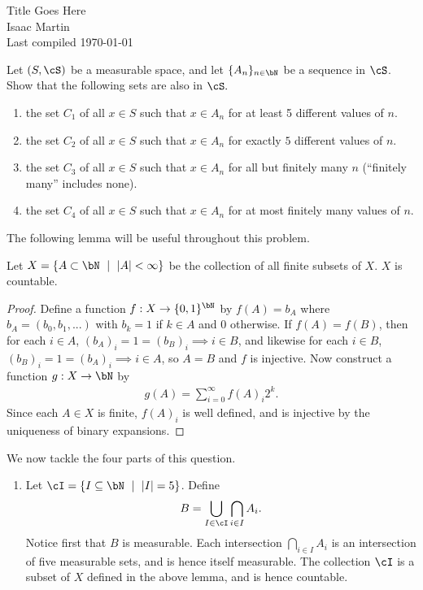 \pagestyle{empty}
	\LARGE
\begin{center}
	Title Goes Here \\
	\Large
	Isaac Martin \\
    Last compiled \today
\end{center}
\normalsize
\vspace{-2mm}
\hru
{}
\begin{homework}[e]
	\prob Let $(S,\cS)$ be a measurable space, and let $\{A_n\}_{n\in \bN}$ be a sequence in $\cS$. Show that the following sets are also in $\cS.$
	\begin{enumerate}[(1)]
		\item the set $C_1$ of all $x \in S$ such that $x \in A_n$ for at least 5 different values of $n$.
		\item the set $C_2$ of all $x \in S$ such that $x \in A_n$ for exactly $5$ different values of $n$.
		\item the set $C_3$ of all $x \in S$ such that $x \in A_n$ for all but finitely many $n$ (``finitely many'' includes none).
		\item the set $C_4$ of all $x \in S$ such that $x \in A_n$ for at most finitely many values of $n$.
	\end{enumerate}
	\begin{prf}
		The following lemma will be useful throughout this problem.
		\begin{lem}\label{lem:finite-subsets-of-bN}
			Let $X = \{A \subset \bN ~\mid~ |A| < \infty\}$ be the collection of all finite subsets of $X$. $X$ is countable.
		\end{lem}
		\begin{proof}
			Define a function $f:X \to \{0,1\}^\bN$ by $f(A) = b_A$ where $b_A = (b_0,b_1,...)$ with $b_k = 1$ if $k \in A$ and $0$ otherwise. If $f(A) = f(B)$, then for each $i \in A$, $(b_A)_i = 1 = (b_B)_i \implies i \in B$, and likewise for each $i \in B$, $(b_B)_i = 1 = (b_A)_i \implies i \in A$, so $A = B$ and $f$ is injective.
			Now construct a function $g:X\to \bN$ by 
			\begin{align*}
				g(A) = \sum_{i = 0}^\infty f(A)_i 2^k.
			\end{align*}
			Since each $A \in X$ is finite, $f(A)_i$ is well defined, and is injective by the uniqueness of binary expansions.
		\end{proof}
		We now tackle the four parts of this question.
		\begin{enumerate}[(1)]
			\item Let $\cI = \{I \subseteq \bN ~\mid~ |I| = 5\}$. Define 
				\begin{align*}
					B = \bigcup_{I \in \cI} \bigcap_{i \in I} A_i.
				\end{align*}
				Notice first that $B$ is measurable. Each intersection $\bigcap_{i \in I} A_i$ is an intersection of five measurable sets, and is hence itself measurable. The collection $\cI$ is a subset of $X$ defined in the above lemma, and is hence countable.


\end{enumerate}
\end{prf}
\end{homework}
